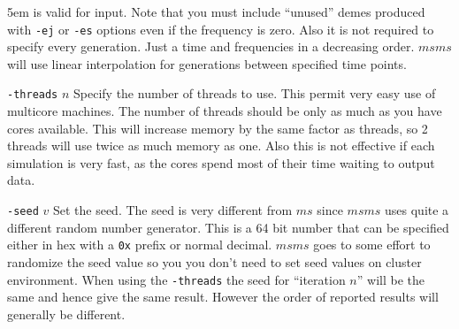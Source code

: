 \documentclass{article}
\begin{document}
\begin{eqlist*}{\topsep5em}
is valid for input. Note that you must include ``unused'' demes produced with
{\tt -ej} or {\tt -es} options even if the frequency is zero. Also it is not
required to specify every generation. Just a time and frequencies in a
decreasing order. $msms$ will use linear interpolation for generations between
specified time points. 
\item[{\tt -threads} $n$] Specify the number of threads to use. This permit
very easy use of multicore machines. The number of threads should be only as much as
you have cores available. This will increase memory by the same factor as
threads, so 2 threads will use twice as much memory as one. Also this is not
effective if each simulation is very fast, as the cores spend most of their time
waiting to output data. 
\item[{\tt -seed} $v$] Set the seed. The seed is very different from $ms$
since $msms$ uses quite a different random number generator. This is a
64 bit number that can be specified either in hex with a {\tt 0x} prefix or
normal decimal. $msms$ goes to some effort to randomize the seed value so you
you don't need to set seed values on cluster environment. When using the
{\tt -threads} the seed for ``iteration $n$'' will be the same and hence give
the same result. However the order of reported results will generally be
different. 
\end{eqlist*}

 
 
\end{document}
